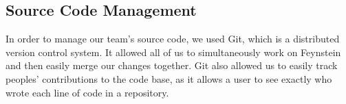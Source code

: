 \subsection{Source Code Management}

In order to manage our team's source code, we used Git, which is a
distributed version control system. It allowed all of us to
simultaneously work on Feynstein and then easily merge our changes
together. Git also allowed us to easily track peoples' contributions
to the code base, as it allows a user to see exactly who wrote each
line of code in a repository.